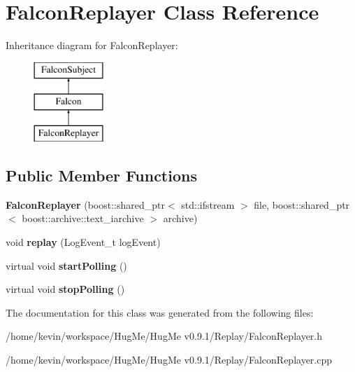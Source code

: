 \hypertarget{classFalconReplayer}{
\section{FalconReplayer Class Reference}
\label{classFalconReplayer}
}
Inheritance diagram for FalconReplayer:\begin{figure}[H]
\begin{center}
\leavevmode
\includegraphics[height=3cm]{classFalconReplayer}
\end{center}
\end{figure}
\subsection*{Public Member Functions}
\begin{DoxyCompactItemize}
\item 
\hypertarget{classFalconReplayer_a8b0921f53e7c34181b9ee8120070acea}{
{\bfseries FalconReplayer} (boost::shared\_\-ptr$<$ std::ifstream $>$ file, boost::shared\_\-ptr$<$ boost::archive::text\_\-iarchive $>$ archive)}
\label{classFalconReplayer_a8b0921f53e7c34181b9ee8120070acea}

\item 
\hypertarget{classFalconReplayer_a831a6e87b2497f0c1af4bc7fd5ed7d54}{
void {\bfseries replay} (LogEvent\_\-t logEvent)}
\label{classFalconReplayer_a831a6e87b2497f0c1af4bc7fd5ed7d54}

\item 
\hypertarget{classFalconReplayer_ad75b679b3c287c4d53041988e7a0ab45}{
virtual void {\bfseries startPolling} ()}
\label{classFalconReplayer_ad75b679b3c287c4d53041988e7a0ab45}

\item 
\hypertarget{classFalconReplayer_a1487ef2142d0a4748f44f78e1356cffa}{
virtual void {\bfseries stopPolling} ()}
\label{classFalconReplayer_a1487ef2142d0a4748f44f78e1356cffa}

\end{DoxyCompactItemize}


The documentation for this class was generated from the following files:\begin{DoxyCompactItemize}
\item 
/home/kevin/workspace/HugMe/HugMe v0.9.1/Replay/FalconReplayer.h\item 
/home/kevin/workspace/HugMe/HugMe v0.9.1/Replay/FalconReplayer.cpp\end{DoxyCompactItemize}
